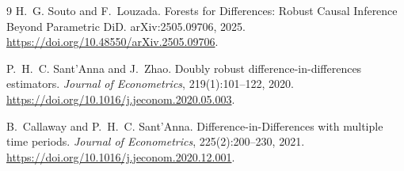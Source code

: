 \documentclass[11pt]{article}
\begin{document}
\begin{thebibliography}{9}
H.~G. Souto and F.~Louzada.
\newblock Forests for Differences: Robust Causal Inference Beyond Parametric DiD.
\newblock arXiv:2505.09706, 2025.
\newblock \url{https://doi.org/10.48550/arXiv.2505.09706}.

P.~H.~C. Sant'Anna and J.~Zhao.
\newblock Doubly robust difference-in-differences estimators.
\newblock \emph{Journal of Econometrics}, 219(1):101--122, 2020.
\newblock \url{https://doi.org/10.1016/j.jeconom.2020.05.003}.

B.~Callaway and P.~H.~C. Sant'Anna.
\newblock Difference-in-Differences with multiple time periods.
\newblock \emph{Journal of Econometrics}, 225(2):200--230, 2021.
\newblock \url{https://doi.org/10.1016/j.jeconom.2020.12.001}.
\end{thebibliography}
\end{document}
